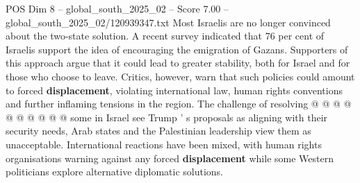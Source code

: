 \begin{textsample}{POS Dim 8 – global\_south\_2025\_02 – Score 7.00 – global\_south\_2025\_02/120939347.txt}
Most Israelis are no longer convinced about the two-state solution.
A recent survey indicated that 76 per cent of Israelis support the idea of encouraging the emigration of Gazans.
Supporters of this approach argue that it could lead to greater stability, both for Israel and for those who choose to leave.
Critics, however, warn that such policies could amount to forced \textbf{displacement}, violating international law, human rights conventions and further inflaming tensions in the region.
The challenge of resolving @ @ @ @ @ @ @ @ @ @ some in Israel see Trump ' s proposals as aligning with their security needs, Arab states and the Palestinian leadership view them as unacceptable.
International reactions have been mixed, with human rights organisations warning against any forced \textbf{displacement} while some Western politicians explore alternative diplomatic solutions.

\end{textsample}
